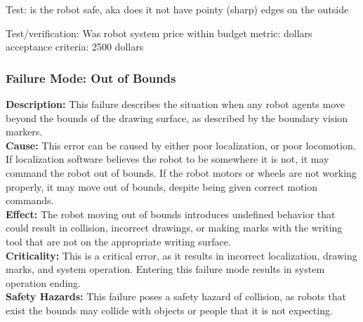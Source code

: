 Test: is the robot safe, aka does it not have pointy (sharp) edges on the outside

Test/verification: Was robot system price within budget
metric: dollars
acceptance criteria: 2500 dollars



\subsubsection{Failure Mode: Out of Bounds}
\label{sec:sys_val_fm_bounds}
\textbf{Description:} This failure describes the situation when any robot agents move beyond the bounds of the drawing surface, as described by the boundary vision markers.\\
\textbf{Cause:} This error can be caused by either poor localization, or poor locomotion. If localization software believes the robot to be somewhere it is not, it may command the robot out of bounds. If the robot motors or wheels are not working properly, it may move out of bounds, despite being given correct motion commands.\\
\textbf{Effect:} The robot moving out of bounds introduces undefined behavior that could result in collision, incorrect drawings, or making marks with the writing tool that are not on the appropriate writing surface.\\
\textbf{Criticality:} This is a critical error, as it results in incorrect localization, drawing marks, and system operation. Entering this failure mode results in system operation ending.\\
\textbf{Safety Hazards:} This failure poses a safety hazard of collision, as robots that exist the bounds may collide with objects or people that it is not expecting.\\

